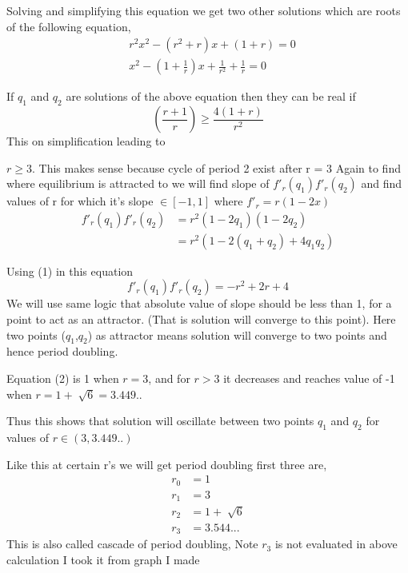 \documentclass{report}
\begin{document}
Solving and simplifying this equation we get two other solutions which are roots of the following equation,
\begin{align}
& r^2x^2 - (r^2+r)x+(1+r) = 0 \nonumber \\
& x^2 - (1+\frac{1}{r})x + \frac{1}{r^2} + \frac{1}{r} = 0
\end{align}


If $q_1$ and $q_2$ are solutions of the above equation then they can be real if
\begin{equation}
    (\frac{r+1}{r}) \geq \frac{4(1+r)}{r^2} \nonumber
\end{equation}
This on simplification leading to \newline

$r \geq 3$. This makes sense because cycle of period 2 exist after r = 3 \newline
Again to find where equilibrium is attracted to we will find slope of $f'_r(q_1)f'_r(q_2)$ and find values of r for which it's slope $\in [-1,1]$ where $f'_r = r(1-2x)$
\begin{align}
f'_r(q_1)f'_r(q_2) &= r^2(1 - 2q_1)(1 - 2q_2) \nonumber \\
 &= r^2(1 - 2(q_1+q_2) + 4q_1q_2) \nonumber
\end{align}

Using (1) in this equation
\begin{equation}
f'_r(q_1)f'_r(q_2) = -r^2 + 2r + 4
\end{equation}
We will use same logic that absolute value of slope should be less than 1, for a point to act as an attractor. (That is solution will converge to this point). Here two points ($q_1$,$q_2$) as attractor means solution will converge to two points and hence period doubling.
\newpage

Equation (2) is 1 when $r = 3$, and for $r > 3$  it decreases and reaches value of -1 when $r = 1 + \sqrt[]{6} = 3.449..$
\newline

Thus this shows that solution will oscillate between two points $q_1$ and $q_2$ for values of $r \in (3,3.449..)$

Like this at certain r's we will get period doubling first three are,
\begin{align}
    r_0 &= 1 \nonumber \\
    r_1 &= 3 \nonumber \\
    r_2 &= 1 + \sqrt[]{6} \nonumber \\
    r_3 &= 3.544... \nonumber
\end{align}
This is also called cascade of period doubling, Note  $r_3$ is not evaluated in above calculation I took it from graph I made
\end{document}
